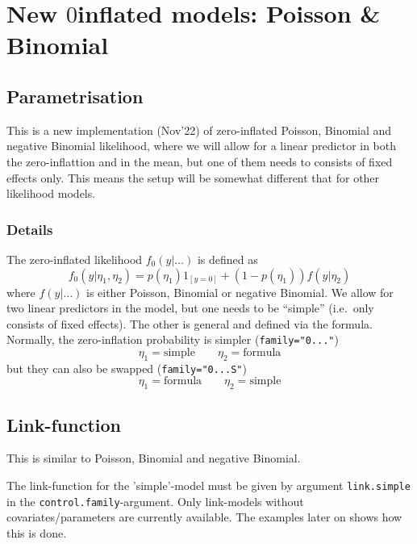 \documentclass[a4paper,11pt]{article}
\begin{document}
\section*{New $0$inflated models: Poisson \& Binomial}

\subsection*{Parametrisation}

This is a new implementation (Nov'22) of zero-inflated Poisson,
Binomial and negative Binomial likelihood, where we will allow for a
linear predictor in both the zero-inflattion and in the mean, but one
of them needs to consists of fixed effects only. This means the setup
will be somewhat different that for other likelihood models.

\subsubsection*{Details}

The zero-inflated likelihood $f_0(y|\ldots)$ is defined as
\begin{displaymath}
    f_0(y | \eta_1, \eta_2) = p(\eta_1) 1_{[y=0]} +
    (1-p(\eta_1)) f(y | \eta_2)
\end{displaymath}
where $f(y|\ldots)$ is either Poisson, Binomial or negative Binomial.
We allow for two linear predictors in the model, but one needs to be
``simple'' (i.e.\ only consists of fixed effects). The other is
general and defined via the formula. Normally, the zero-inflation
probability is simpler (\texttt{family="0..."})
\begin{displaymath}
    \eta_1 = \text{simple} \qquad \eta_2 = \text{formula}
\end{displaymath}
but they can also be swapped (\texttt{family="0...S"})
\begin{displaymath}
    \eta_1 = \text{formula} \qquad \eta_2 = \text{simple}
\end{displaymath}

\subsection*{Link-function}

This is similar to Poisson, Binomial and negative Binomial.

The link-function for the 'simple'-model must be given by argument
\texttt{link.simple} in the \texttt{control.family}-argument. Only
link-models without covariates/parameters are currently available. 
The examples later on shows how this is done.
\end{document}
